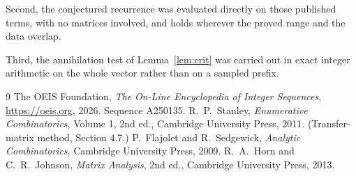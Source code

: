 \documentclass[11pt,a4paper]{article}
\theoremstyle{plain}
\theoremstyle{definition}
\begin{document}
Second, the conjectured recurrence was evaluated directly on those published terms, with no
matrices involved, and holds wherever the proved range and the data overlap.

Third, the annihilation test of Lemma~\ref{lem:crit} was carried out in exact integer
arithmetic on the whole vector rather than on a sampled prefix.

\begin{thebibliography}{9}
 The OEIS Foundation, \emph{The On-Line Encyclopedia of Integer
Sequences}, \url{https://oeis.org}, 2026. Sequence A250135.
 R.~P.~Stanley, \emph{Enumerative Combinatorics}, Volume 1, 2nd ed.,
Cambridge University Press, 2011. (Transfer-matrix method, Section 4.7.)
 P.~Flajolet and R.~Sedgewick, \emph{Analytic Combinatorics}, Cambridge
University Press, 2009.
 R.~A.~Horn and C.~R.~Johnson, \emph{Matrix Analysis}, 2nd ed., Cambridge
University Press, 2013.
\end{thebibliography}
\end{document}
